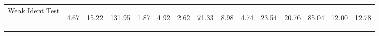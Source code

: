\begin{center}
\begin{tabular}{lcccccccccccccc}
Weak Ident Test  & \begin{normalsize}4.67\end{normalsize} & \begin{normalsize}15.22\end{normalsize} & \begin{normalsize}131.95\end{normalsize} & \begin{normalsize}1.87\end{normalsize} & \begin{normalsize}4.92\end{normalsize} & \begin{normalsize}2.62\end{normalsize} & \begin{normalsize}71.33\end{normalsize} & \begin{normalsize}8.98\end{normalsize} & \begin{normalsize}4.74\end{normalsize} & \begin{normalsize}23.54\end{normalsize} & \begin{normalsize}20.76\end{normalsize} & \begin{normalsize}85.04\end{normalsize} & \begin{normalsize}12.00\end{normalsize} & \begin{normalsize}12.78\end{normalsize}\\

\end{tabular}
\end{center}
